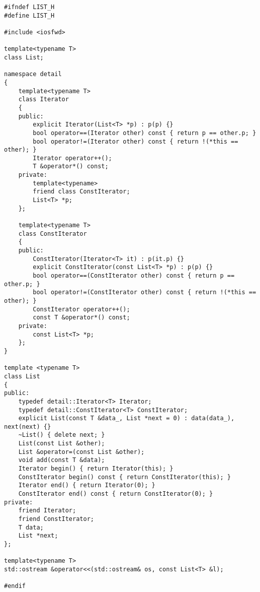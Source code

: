 \documentclass[a4paper,11.5pt]{article}
\begin{document}
\begin{lstlisting}
#ifndef LIST_H
#define LIST_H

#include <iosfwd>

template<typename T>
class List;

namespace detail 
{
	template<typename T>
	class Iterator
	{
	public:
		explicit Iterator(List<T> *p) : p(p) {}
		bool operator==(Iterator other) const { return p == other.p; }
		bool operator!=(Iterator other) const { return !(*this == other); }
		Iterator operator++();
		T &operator*() const;
	private:
		template<typename>
		friend class ConstIterator;
		List<T> *p;
	};
	
	template<typename T>
	class ConstIterator
	{
	public:
		ConstIterator(Iterator<T> it) : p(it.p) {}
		explicit ConstIterator(const List<T> *p) : p(p) {}
		bool operator==(ConstIterator other) const { return p == other.p; }
		bool operator!=(ConstIterator other) const { return !(*this == other); }
		ConstIterator operator++();
		const T &operator*() const;
	private:
		const List<T> *p;
	};	
}

template <typename T>
class List 
{
public:
	typedef detail::Iterator<T> Iterator;
	typedef detail::ConstIterator<T> ConstIterator;
	explicit List(const T &data_, List *next = 0) : data(data_), next(next) {}
	~List() { delete next; }
	List(const List &other);
	List &operator=(const List &other);
	void add(const T &data);
	Iterator begin() { return Iterator(this); }
	ConstIterator begin() const { return ConstIterator(this); }
	Iterator end() { return Iterator(0); }
	ConstIterator end() const { return ConstIterator(0); }
private:
	friend Iterator;
	friend ConstIterator;
	T data;
	List *next;
};

template<typename T>
std::ostream &operator<<(std::ostream& os, const List<T> &l);

#endif
\end{lstlisting}
\end{document}
